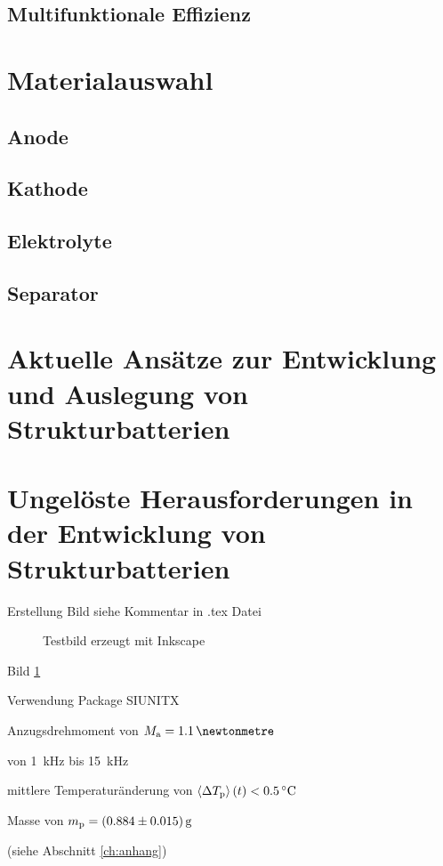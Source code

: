 \subsection{Multifunktionale Effizienz}

\section{Materialauswahl}
\subsection{Anode}
\subsection{Kathode}
\subsection{Elektrolyte}
\subsection{Separator}


\section{Aktuelle Ansätze zur Entwicklung und Auslegung von Strukturbatterien}

\section{Ungelöste Herausforderungen in der Entwicklung von Strukturbatterien}
Erstellung Bild siehe Kommentar in .tex Datei


\begin{figure}[h]
	\def\svgscale{0.98}
		 
		\caption{\label{fig:testbild}Testbild erzeugt mit Inkscape}
\end{figure}

Bild \ref{fig:testbild} \cite{Dannemann.Kucher_et.al_AppliedSciences_2018}  

Verwendung Package SIUNITX %

Anzugsdrehmoment von $M_{\textnormal{a}}=\SI{1.1}{\newtonmetre}$

von \SI{1}{\kilo\hertz} bis \SI{15}{\kilo\hertz}

mittlere Temperaturänderung von $\left\langle \Delta T_{\textnormal{p}}\right\rangle(t)<\SI{0.5}{\degreeCelsius}$

Masse von $m_{\textnormal{p}}=\SI[separate-uncertainty]{0.884 (15)}{\gram}$

(siehe Abschnitt \ref{ch:anhang})